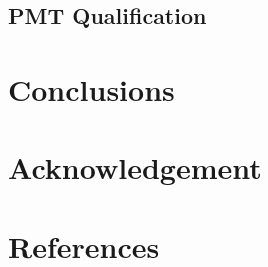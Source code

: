\documentclass[preprint,5p,times]{elsarticle}
\begin{document}
\subsection{PMT Qualification}
\label{sec:qualification}

\section{Conclusions}
\label{sec:conclustions}

\section*{Acknowledgement}

\appendix
\section{}
\label{app:}

\section*{References}

\end{document}
